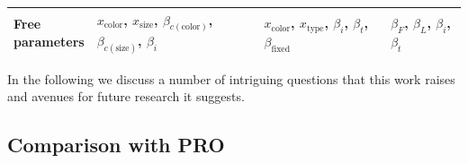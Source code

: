 \documentclass[11pt]{article}
\begin{document}
\begin{table}
\begin{tabular}{p{2.5cm} p{4.2cm} p{4.2cm} p{4.2cm} }
\midrule
\makecell{Free\\ parameters} & 
	\makecell{$x_{\textrm{color}}$, $x_{\textrm{size}}$, \\ $\beta_{c(\textrm{color})}$,  $\beta_{c(\textrm{size})}$, $\beta_i$} & 
	\makecell{$x_{\textrm{color}}$, $x_{\textrm{type}}$, \\ $\beta_i$, $\beta_t$, $\beta_{\textrm{fixed}}$} & 
	$\beta_F$, $\beta_L$, $\beta_i$, $\beta_t$ \\
\bottomrule
\end{tabular}
\label{tab:modeldiffs}
\end{table}


In the following we discuss a number of intriguing questions that this work raises and avenues for future research it suggests.

\subsection{Comparison with PRO}
\end{document}
